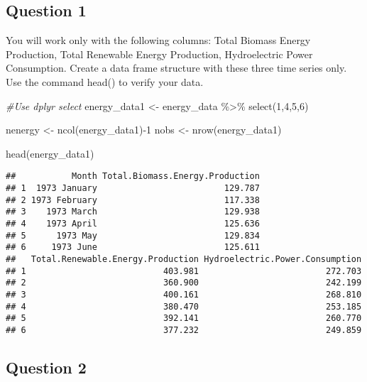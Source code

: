 \documentclass[
]{article}
\newenvironment{Shaded}{\begin{snugshade}}{\end{snugshade}}
\newcommand{\CommentTok}[1]{\textcolor[rgb]{0.56,0.35,0.01}{\textit{#1}}}
\newcommand{\DecValTok}[1]{\textcolor[rgb]{0.00,0.00,0.81}{#1}}
\newcommand{\FunctionTok}[1]{\textcolor[rgb]{0.00,0.00,0.00}{#1}}
\newcommand{\NormalTok}[1]{#1}
\newcommand{\OtherTok}[1]{\textcolor[rgb]{0.56,0.35,0.01}{#1}}
\newcommand{\SpecialCharTok}[1]{\textcolor[rgb]{0.00,0.00,0.00}{#1}}
\begin{document}
\hypertarget{question-1}{%
\subsection{Question 1}\label{question-1}}

You will work only with the following columns: Total Biomass Energy
Production, Total Renewable Energy Production, Hydroelectric Power
Consumption. Create a data frame structure with these three time series
only. Use the command head() to verify your data.

\begin{Shaded}
\begin{Highlighting}[]
\CommentTok{\#Use dplyr select}
\NormalTok{energy\_data1 }\OtherTok{\textless{}{-}}\NormalTok{ energy\_data }\SpecialCharTok{\%\textgreater{}\%} \FunctionTok{select}\NormalTok{(}\DecValTok{1}\NormalTok{,}\DecValTok{4}\NormalTok{,}\DecValTok{5}\NormalTok{,}\DecValTok{6}\NormalTok{) }

\NormalTok{nenergy }\OtherTok{\textless{}{-}} \FunctionTok{ncol}\NormalTok{(energy\_data1)}\SpecialCharTok{{-}}\DecValTok{1}
\NormalTok{nobs }\OtherTok{\textless{}{-}} \FunctionTok{nrow}\NormalTok{(energy\_data1) }

\FunctionTok{head}\NormalTok{(energy\_data1)}
\end{Highlighting}
\end{Shaded}

\begin{verbatim}
##           Month Total.Biomass.Energy.Production
## 1  1973 January                         129.787
## 2 1973 February                         117.338
## 3    1973 March                         129.938
## 4    1973 April                         125.636
## 5      1973 May                         129.834
## 6     1973 June                         125.611
##   Total.Renewable.Energy.Production Hydroelectric.Power.Consumption
## 1                           403.981                         272.703
## 2                           360.900                         242.199
## 3                           400.161                         268.810
## 4                           380.470                         253.185
## 5                           392.141                         260.770
## 6                           377.232                         249.859
\end{verbatim}

\hypertarget{question-2}{%
\subsection{Question 2}\label{question-2}}
\end{document}
